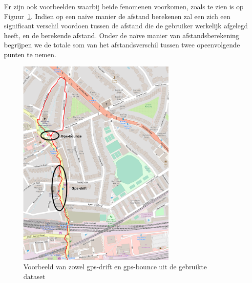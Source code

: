 Er zijn ook voorbeelden waarbij beide fenomenen voorkomen, zoals te zien is op
Figuur~\ref{fig:gps_drift_bounce_Strava}. Indien op een naïve manier de afstand
berekenen zal een zich een significant verschil voordoen tussen de afstand die
de gebruiker werkelijk afgelegd heeft, en de berekende afstand. Onder de naïve
manier van afstandsberekening begrijpen we de totale som van het
afstandsverschil tussen twee opeenvolgende punten te nemen.
\begin{figure}
    \centering
    \includegraphics[width=0.7\textwidth]{fig/Afwijkingen&Analyses/Crooked Routes/1_notSnapped.png}
    \caption{Voorbeeld van zowel gps-drift en gps-bounce uit de gebruikte dataset}\label{fig:gps_drift_bounce_Strava}
\end{figure}

